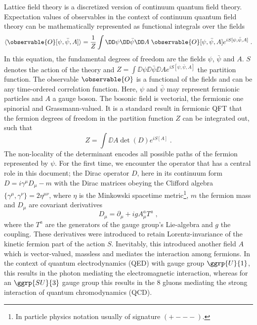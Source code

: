 Lattice field theory is a discretized version of continuum quantum field theory.
Expectation values of observables in the context of continuum quantum field theory can be mathematically represented as functional integrals over the fields~\cite{Feynman1948}
\begin{equation} \label{eq:path:integral:expectation:value}
\langle \observable{O}[\psi, \bar{\psi}, A] \rangle =
\frac{1}{Z} \int
\DD \psi
\DD \bar{\psi}
\DD A \;
\observable{O}[\psi, \bar{\psi}, A]
e^{i S[\psi, \bar{\psi}, A]} \;.
\end{equation}
In this equation, the fundamental degrees of freedom are the fields $\psi$, $\bar{\psi}$ and $A$.
$S$ denotes the action of the theory and $Z = \int \DD \psi \DD \bar{\psi} \DD A e^{i S[\psi, \bar{\psi}, A]}$ the partition function.
The observable $\observable{O}$ is a functional of the fields and can be any time-ordered correlation function.
Here, $\psi$ and $\bar{\psi}$ may represent fermionic particles and $A$ a gauge boson.
The bosonic field is vectorial, the fermionic one spinorial and Grassmann-valued.
It is a standard result in fermionic QFT that the fermion degrees of freedom in the partition function $Z$ can be integrated out, such that
\begin{equation}
Z = \int \DD A \det(D) e^{i S[A]} \;.
\end{equation}
The non-locality of the determinant encodes all possible paths of the fermion represented by $\psi$.
For the first time, we encounter the operator that has a central role in this document; the Dirac operator $D$, here in its continuum form $D = i \gamma^{\mu} D_{\mu} - m$ with the Dirac matrices obeying the Clifford algebra $\{\gamma^{\mu}, \gamma^{\nu}\} = 2 \eta^{\mu \nu}$, where $\eta$ is the Minkowski spacetime metric\footnote{In particle physics notation usually of signature $(+---)$.}, $m$ the fermion mass and $D_{\mu}$ are covariant derivatives
\begin{equation}
D_{\mu} = \partial_{\mu} + ig A_{\mu}^{a} T^{a} \;,
\end{equation}
where the $T^{a}$ are the generators of the gauge group's Lie-algebra and $g$ the coupling.
These derivatives were introduced to retain Lorentz-invariance of the kinetic fermion part of the action $S$.
Inevitably, this introduced another field $A$ which is vector-valued, massless and mediates the interaction among fermions.
In the context of quantum electrodynamics (QED) with gauge group $\ggrp{U}{1}$, this results in the photon mediating the electromagnetic interaction, whereas for an $\ggrp{SU}{3}$ gauge group this results in the \num{8} gluons mediating the strong interaction of quantum chromodynamics (QCD).

